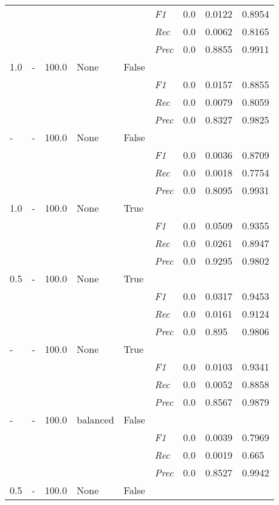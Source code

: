 \begin{table}[H]
\begin{tabularx}{\textwidth}{XXXXX|X|X|X|X}
    & & & & & \textit{F1} & 0.0 & 0.0122    & 0.8954    \\
    & & & & & \textit{Rec} &  0.0 & 0.0062 & 0.8165   \\
    & & & & & \textit{Prec} & 0.0 & 0.8855 & 0.9911 \\ \midrule
    1.0 & - & 100.0 & None & False & & & \\
    & & & & & \textit{F1} & 0.0 & 0.0157    & 0.8855    \\
    & & & & & \textit{Rec} &  0.0 & 0.0079 & 0.8059   \\
    & & & & & \textit{Prec} & 0.0 & 0.8327 & 0.9825 \\ \midrule
    - & - & 100.0 & None & False & & & \\
    & & & & & \textit{F1} & 0.0 & 0.0036    & 0.8709    \\
    & & & & & \textit{Rec} &  0.0 & 0.0018 & 0.7754   \\
    & & & & & \textit{Prec} & 0.0 & 0.8095 & 0.9931 \\ \midrule
    1.0 & - & 100.0 & None & True & & & \\
    & & & & & \textit{F1} & 0.0 & 0.0509    & 0.9355    \\
    & & & & & \textit{Rec} &  0.0 & 0.0261 & 0.8947   \\
    & & & & & \textit{Prec} & 0.0 & 0.9295 & 0.9802 \\ \midrule
    0.5 & - & 100.0 & None & True & & & \\
    & & & & & \textit{F1} & 0.0 & 0.0317    & 0.9453    \\
    & & & & & \textit{Rec} &  0.0 & 0.0161 & 0.9124   \\
    & & & & & \textit{Prec} & 0.0 & 0.895 & 0.9806 \\ \midrule
    - & - & 100.0 & None & True & & & \\
    & & & & & \textit{F1} & 0.0 & 0.0103    & 0.9341    \\
    & & & & & \textit{Rec} &  0.0 & 0.0052 & 0.8858   \\
    & & & & & \textit{Prec} & 0.0 & 0.8567 & 0.9879 \\ \midrule
    - & - & 100.0 & balanced & False & & & \\
    & & & & & \textit{F1} & 0.0 & 0.0039    & 0.7969    \\
    & & & & & \textit{Rec} &  0.0 & 0.0019 & 0.665   \\
    & & & & & \textit{Prec} & 0.0 & 0.8527 & 0.9942 \\ \midrule
    0.5 & - & 100.0 & None & False & & & \\

\end{tabularx}
\end{table}
